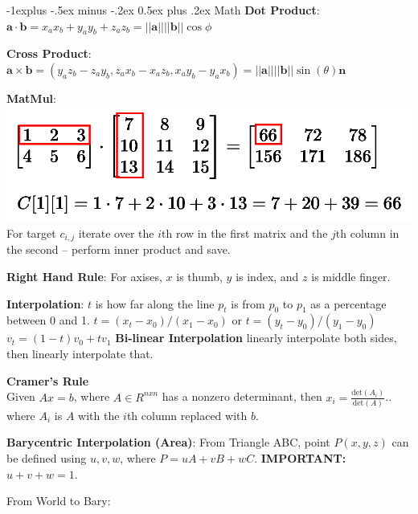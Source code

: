 \documentclass[letterpaper, 8pt]{extarticle}
\makeatletter
\renewcommand{\section}{\@startsection{section}{1}{0mm}%
                                {-1explus -.5ex minus -.2ex}%
                                {0.5ex plus .2ex}%
                                {\normalfont\small\bfseries}}
\makeatother
\begin{document}
\begin{multicols*}{4}

    \section{Math}
    \textbf{Dot Product}:
    \(
    \mathbf{a} \cdot \mathbf{b}
    = x_a x_b + y_a y_b + z_a z_b
    = ||\mathbf{a}|| ||\mathbf{b}|| \cos \phi
    \)

    \textbf{Cross Product}:
    \(
    \mathbf{a} \times \mathbf{b}
    = (y_a z_b - z_a y_b, z_a x_b - x_a z_b, x_a y_b - y_a x_b)
    = ||\mathbf{a}|| ||\mathbf{b}|| \sin(\theta) \mathbf{n}
    \)

    \textbf{MatMul}:\\
    \includegraphics[width=0.5\linewidth]{matrix-multiply-a.png}
    For target $c_{i,j}$ iterate over the $i$th row in the first matrix and the $j$th column in the second -- perform inner product and save.

    \textbf{Right Hand Rule}:
    For axises, $x$ is thumb, $y$ is index, and $z$ is middle finger.

    \textbf{Interpolation}:
    \(t\) is how far along the line \(p_t\) is from \(p_0\) to \(p_1\) as a percentage between 0 and 1.
    \(
    t = (x_t - x_0) / (x_1 - x_0)
    \text{ or }
    t = (y_t - y_0) / (y_1 - y_0)
    \)
    \(
    v_t = (1-t) v_0 + t v_1
    \)
    \textbf{Bi-linear Interpolation}
    linearly interpolate both sides, then linearly interpolate that.

    \textbf{Cramer's Rule} \\
    Given $Ax=b$, where $A \in R^{nxn}$ has a nonzero determinant, then $x_i = \frac{\text{det}(A_i)}{\text{det}(A)}$.. where $A_i$ is $A$ with the $i$th column replaced with $b$.

    \textbf{Barycentric Interpolation (Area)}:
    From Triangle ABC, point $P(x,y,z)$ can be defined using $u,v,w$, where $P = uA + vB + wC$. \textbf{IMPORTANT:} $u + v + w = 1$.

    From World to Bary:


\end{multicols*}
\end{document}
